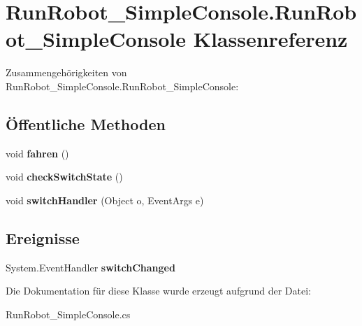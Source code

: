 \hypertarget{class_run_robot___simple_console_1_1_run_robot___simple_console}{
\section{RunRobot\_\-SimpleConsole.RunRobot\_\-SimpleConsole Klassenreferenz}
\label{class_run_robot___simple_console_1_1_run_robot___simple_console}
}


Zusammengehörigkeiten von RunRobot\_\-SimpleConsole.RunRobot\_\-SimpleConsole:\subsection*{Öffentliche Methoden}
\begin{DoxyCompactItemize}
\item 
\hypertarget{class_run_robot___simple_console_1_1_run_robot___simple_console_a40da4517920bfe3bec78b5d9ff647624}{
void {\bfseries fahren} ()}
\label{class_run_robot___simple_console_1_1_run_robot___simple_console_a40da4517920bfe3bec78b5d9ff647624}

\item 
\hypertarget{class_run_robot___simple_console_1_1_run_robot___simple_console_a1f299b69c7bd40f4da053fcf6fe036a6}{
void {\bfseries checkSwitchState} ()}
\label{class_run_robot___simple_console_1_1_run_robot___simple_console_a1f299b69c7bd40f4da053fcf6fe036a6}

\item 
\hypertarget{class_run_robot___simple_console_1_1_run_robot___simple_console_a4813c7fe1386c01b2934a921034da646}{
void {\bfseries switchHandler} (Object o, EventArgs e)}
\label{class_run_robot___simple_console_1_1_run_robot___simple_console_a4813c7fe1386c01b2934a921034da646}

\end{DoxyCompactItemize}
\subsection*{Ereignisse}
\begin{DoxyCompactItemize}
\item 
\hypertarget{class_run_robot___simple_console_1_1_run_robot___simple_console_ae146f063d5e7c1012b5c2a398669083f}{
System.EventHandler {\bfseries switchChanged}}
\label{class_run_robot___simple_console_1_1_run_robot___simple_console_ae146f063d5e7c1012b5c2a398669083f}

\end{DoxyCompactItemize}


Die Dokumentation für diese Klasse wurde erzeugt aufgrund der Datei:\begin{DoxyCompactItemize}
\item 
RunRobot\_\-SimpleConsole.cs\end{DoxyCompactItemize}
